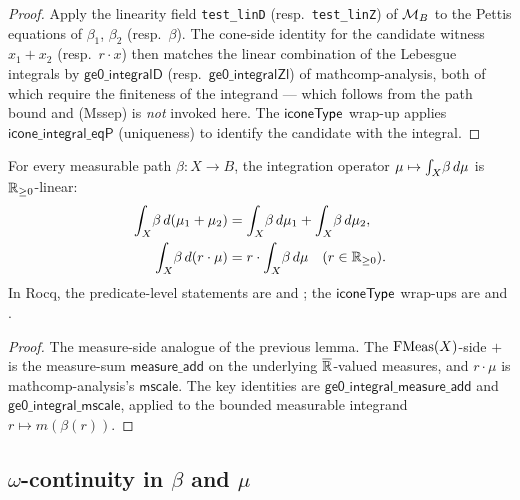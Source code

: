 \begin{proof}
Apply the linearity field \texttt{test\_linD} (resp.\
\texttt{test\_linZ}) of $\mathcal{M}_B$ to the Pettis equations of
$\beta_1$, $\beta_2$ (resp.\ $\beta$). The cone-side identity for
the candidate witness $x_1 + x_2$ (resp.\ $r \cdot x$) then matches
the linear combination of the Lebesgue integrals by
$\mathsf{ge0\_integralD}$ (resp.\ $\mathsf{ge0\_integralZl}$) of
mathcomp-analysis, both of which require the finiteness of the
integrand --- which follows from the path bound and (Mssep) is
\emph{not} invoked here. The $\mathsf{iconeType}$ wrap-up applies
$\mathsf{icone\_integral\_eqP}$ (uniqueness) to identify the
candidate with the integral.
\end{proof}

\begin{lemma}[Linearity in $\mu$]\label{lem:integral-lin-mu}
For every measurable path $\beta : X \to B$, the integration
operator $\mu \mapsto \int_{X}\!\beta\,d\mu$ is
$\mathbb{R}_{\geq 0}$-linear:
\begin{align*}
  \int_{X}\!\beta\,d(\mu_1 + \mu_2) &= \int_{X}\!\beta\,d\mu_1
    + \int_{X}\!\beta\,d\mu_2, \\
  \int_{X}\!\beta\,d(r \cdot \mu) &= r \cdot \int_{X}\!\beta\,d\mu
    \quad (r \in \mathbb{R}_{\geq 0}).
\end{align*}
In Rocq, the predicate-level statements are
 and
; the
$\mathsf{iconeType}$ wrap-ups are
 and
. \rocqok
\end{lemma}

\begin{proof}
The measure-side analogue of the previous lemma. The
$\mathrm{FMeas}(X)$-side $+$ is the measure-sum
$\mathsf{measure\_add}$ on the underlying $\overline{\mathbb{R}}$-valued
measures, and $r \cdot \mu$ is mathcomp-analysis's $\mathsf{mscale}$.
The key identities are
$\mathsf{ge0\_integral\_measure\_add}$ and
$\mathsf{ge0\_integral\_mscale}$, applied to the bounded
measurable integrand $r \mapsto m(\beta(r))$.
\end{proof}

\subsection{\texorpdfstring{$\omega$}{omega}-continuity in \texorpdfstring{$\beta$}{beta} and \texorpdfstring{$\mu$}{mu}}\label{ssec:omega-cont}

